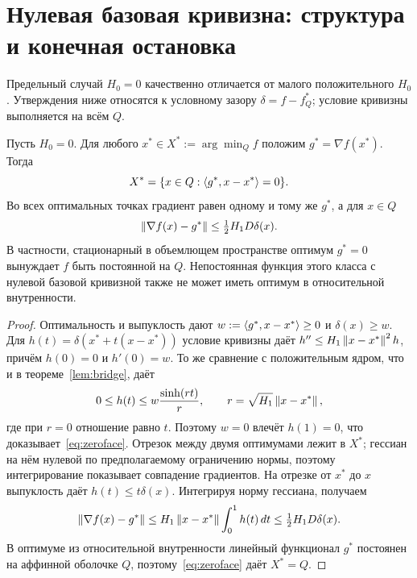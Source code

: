 \section{Нулевая базовая кривизна: структура и конечная остановка}
\label{sec:zero}
Предельный случай $H_0=0$ качественно отличается от малого
положительного $H_0$. Утверждения ниже относятся к условному зазору
$\delta=f-f_Q^*$; условие кривизны выполняется на всём $Q$.

\begin{proposition}
\label{prop:zeroface}
Пусть $H_0=0$. Для любого $x^*\in X^*:=\arg\min_Q f$ положим
$g^*=\nabla f(x^*)$. Тогда
\begin{equation}\label{eq:zeroface}
 X^*=\{x\in Q:\left\langle g^*,x-x^*\right\rangle=0\}.
\end{equation}
Во всех оптимальных точках градиент равен одному и тому же $g^*$,
а для $x\in Q$
\begin{equation}\label{eq:zerograd}
 \left\|\nabla f(x)-g^*\right\|\le\tfrac12H_1D\delta(x).
\end{equation}
В частности, стационарный в объемлющем пространстве оптимум $g^*=0$
вынуждает $f$ быть постоянной на $Q$. Непостоянная функция этого
класса с нулевой базовой кривизной также не может иметь оптимум в
относительной внутренности.
\end{proposition}
\begin{proof}
Оптимальность и выпуклость дают $w:=\left\langle g^*,x-x^*\right\rangle\ge0$ и
$\delta(x)\ge w$. Для $h(t)=\delta(x^*+t(x-x^*))$ условие
кривизны даёт $h''\le H_1\left\|x-x^*\right\|^2h$, причём $h(0)=0$ и
$h'(0)=w$. То же сравнение с положительным ядром, что и в
теореме~\ref{lem:bridge}, даёт
\[
 0\le h(t)\le w\frac{\sinh(rt)}r,\qquad
 r=\sqrt{H_1}\left\|x-x^*\right\|,
\]
где при $r=0$ отношение равно $t$. Поэтому $w=0$ влечёт
$h(1)=0$, что доказывает~\eqref{eq:zeroface}.
Отрезок между двумя оптимумами лежит в $X^*$; гессиан на нём
нулевой по предполагаемому ограничению нормы, поэтому интегрирование
показывает совпадение градиентов. На отрезке от $x^*$ до $x$
выпуклость даёт $h(t)\le t\delta(x)$. Интегрируя норму гессиана,
получаем
\[
 \left\|\nabla f(x)-g^*\right\|
 \le H_1\left\|x-x^*\right\|\int_0^1h(t)\,dt
 \le\tfrac12H_1D\delta(x).
\]
В оптимуме из относительной внутренности линейный функционал $g^*$
постоянен на аффинной оболочке $Q$, поэтому~\eqref{eq:zeroface}
даёт $X^*=Q$.
\end{proof}

